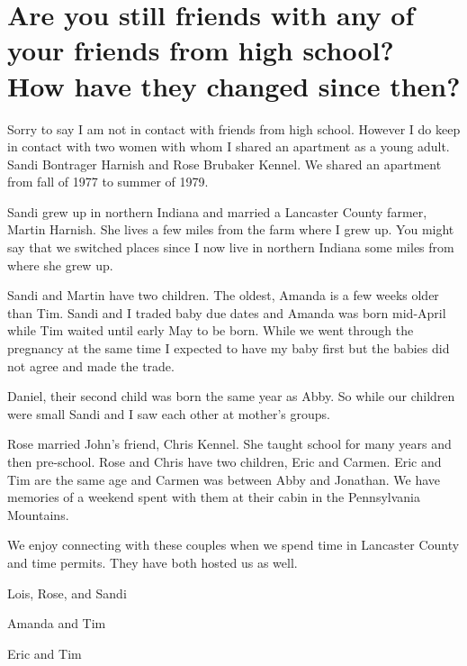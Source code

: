\section{Are you still friends with any of your friends from high school? How have they changed since then?}
Sorry to say I am not in contact with friends from high school.
However I do keep in contact with two women with whom I shared an apartment as a young adult.
Sandi Bontrager Harnish and Rose Brubaker Kennel.
We shared an apartment from fall of 1977 to summer of 1979.

Sandi grew up in northern Indiana and married a Lancaster County farmer, Martin Harnish.
She lives a few miles from the farm where I grew up.
You might say that we switched places since I now live in northern Indiana some miles from where she grew up.

Sandi and Martin have two children.
The oldest, Amanda is a few weeks older than Tim.
Sandi and I traded baby due dates and Amanda was born mid-April while Tim waited until early May to be born.
While we went through the pregnancy at the same time I expected to have my baby first but the babies did not agree and made the trade.

Daniel, their second child was born the same year as Abby.
So while our children were small Sandi and I saw each other at mother's groups.

Rose married John's friend, Chris Kennel.
She taught school for many years and then pre-school.
Rose and Chris have two children, Eric and Carmen.
Eric and Tim are the same age and Carmen was between Abby and Jonathan.
We have memories of a weekend spent with them at their cabin in the Pennsylvania Mountains.

We enjoy connecting with these couples when we spend time in Lancaster County and time permits.
They have both hosted us as well.

Lois, Rose, and Sandi

Amanda and Tim

Eric and Tim





